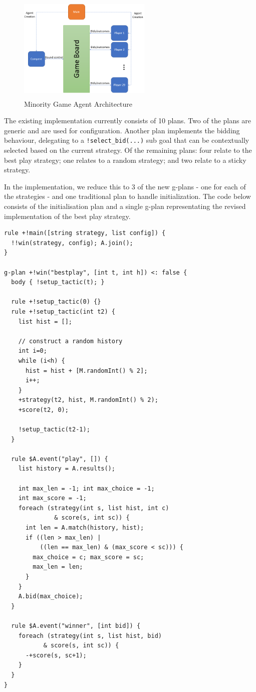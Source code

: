 \begin{figure}[!tbh]
\centering
\includegraphics[height=2in, width=2.5in]{mg.png}
\caption{Minority Game Agent Architecture}
\label{fig:mgagents}
\end{figure}

The existing implementation currently consists of 10 plans. Two of the plans are generic and are
used for configuration. Another plan implements the bidding behaviour, delegating to a 
\verb|!select_bid(...)| sub goal that can be contextually selected based on the current strategy.
Of the remaining plans: four relate to the best play strategy; one relates to a random strategy;
and two relate to a sticky strategy.

In the {\aser} implementation, we reduce this to 3 of the new g-plans - one for each of the 
strategies - and one traditional plan to handle initialization. The code below consists of
the initialisation plan and a single g-plan representating the revised implementation of the 
best play strategy.

{\small
\begin{verbatim}
rule +!main([string strategy, list config]) {
  !!win(strategy, config); A.join();
}

g-plan +!win("bestplay", [int t, int h]) <: false {
  body { !setup_tactic(t); }

  rule +!setup_tactic(0) {}
  rule +!setup_tactic(int t2) {
    list hist = [];
			
    // construct a random history
    int i=0;
    while (i<h) {
      hist = hist + [M.randomInt() % 2];
      i++;
    }
    +strategy(t2, hist, M.randomInt() % 2);
    +score(t2, 0);
		
    !setup_tactic(t2-1);
  }
		
  rule $A.event("play", []) { 
    list history = A.results();
			
    int max_len = -1; int max_choice = -1;
    int max_score = -1;
    foreach (strategy(int s, list hist, int c) 
              & score(s, int sc)) {
      int len = A.match(history, hist);
      if ((len > max_len) | 
          ((len == max_len) & (max_score < sc))) {
        max_choice = c; max_score = sc;
        max_len = len;
      }
    }
    A.bid(max_choice);
  }

  rule $A.event("winner", [int bid]) {
    foreach (strategy(int s, list hist, bid) 
           & score(s, int sc)) {
      -+score(s, sc+1);
    }
  }
}
\end{verbatim}}

